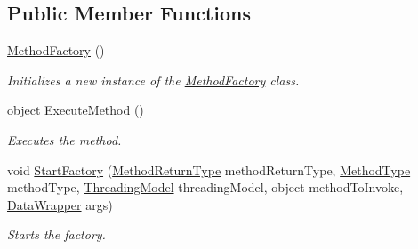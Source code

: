 \subsection*{Public Member Functions}
\begin{DoxyCompactItemize}
\item 
\hyperlink{class_stand_alone_framework_1_1_factories_1_1_method_factory_1_1_method_factory_a03c9d9ba7c468c89fd8e0e791033fa5d}{Method\+Factory} ()
\begin{DoxyCompactList}\small\item\em Initializes a new instance of the \hyperlink{class_stand_alone_framework_1_1_factories_1_1_method_factory_1_1_method_factory}{Method\+Factory} class. \end{DoxyCompactList}\item 
object \hyperlink{class_stand_alone_framework_1_1_factories_1_1_method_factory_1_1_method_factory_a5e1c85f6928f23809770682565ce18ef}{Execute\+Method} ()
\begin{DoxyCompactList}\small\item\em Executes the method. \end{DoxyCompactList}\item 
void \hyperlink{class_stand_alone_framework_1_1_factories_1_1_method_factory_1_1_method_factory_ad7266b9459d17e8931b267470a3f65a3}{Start\+Factory} (\hyperlink{namespace_stand_alone_framework_1_1_factories_1_1_method_factory_a03ffbf0d8e733b86d0ac29ae38dd4241}{Method\+Return\+Type} method\+Return\+Type, \hyperlink{namespace_stand_alone_framework_1_1_factories_1_1_method_factory_aeb6e05dc016e73b072faae5a5d275f6a}{Method\+Type} method\+Type, \hyperlink{namespace_stand_alone_framework_1_1_factories_1_1_thread_factory_aaa02326f96ee10b7d0fd360488d27c39}{Threading\+Model} threading\+Model, object method\+To\+Invoke, \hyperlink{class_stand_alone_framework_1_1_data_wrapper}{Data\+Wrapper} args)
\begin{DoxyCompactList}\small\item\em Starts the factory. \end{DoxyCompactList}\end{DoxyCompactItemize}
